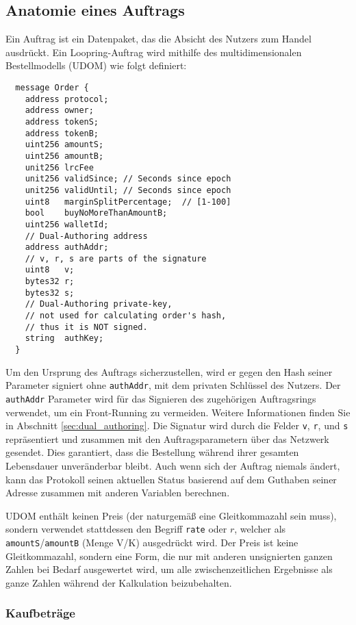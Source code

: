 \documentclass[UTF8,nofonts]{article}
\begin{document}
\begin{multicols}{2}
\subsection{Anatomie eines Auftrags\label{anatomy}}
Ein Auftrag ist ein Datenpaket, das die Absicht des Nutzers zum Handel ausdrückt. Ein Loopring-Auftrag wird mithilfe des multidimensionalen Bestellmodells (UDOM) wie folgt definiert:

\begin{verbatim}
  message Order {
    address protocol;
    address owner;
    address tokenS;
    address tokenB;
    uint256 amountS;
    uint256 amountB;
    unit256 lrcFee
    unit256 validSince; // Seconds since epoch
    unit256 validUntil; // Seconds since epoch
    uint8   marginSplitPercentage;  // [1-100]
    bool    buyNoMoreThanAmountB;
    uint256 walletId;
    // Dual-Authoring address
    address authAddr;
   	// v, r, s are parts of the signature
    uint8   v;       
    bytes32 r;
    bytes32 s;
    // Dual-Authoring private-key,
    // not used for calculating order's hash,
    // thus it is NOT signed.
    string  authKey;          
  }
\end{verbatim}

Um den Ursprung des Auftrags sicherzustellen, wird er gegen den Hash seiner Parameter signiert ohne \verb|authAddr|, mit dem privaten Schlüssel des Nutzers. Der \verb|authAddr| Parameter wird für das Signieren des zugehörigen Auftragsrings verwendet, um ein Front-Running zu vermeiden. Weitere Informationen finden Sie in Abschnitt \ref{sec:dual_authoring}. Die Signatur wird durch die Felder \verb|v|, \verb|r|, und \verb|s| repräsentiert und zusammen mit den Auftragsparametern über das Netzwerk gesendet. Dies garantiert, dass die Bestellung während ihrer gesamten Lebensdauer unveränderbar bleibt. Auch wenn sich der Auftrag niemals ändert, kann das Protokoll seinen aktuellen Status basierend auf dem Guthaben seiner Adresse zusammen mit anderen Variablen berechnen.

UDOM enthält keinen Preis (der naturgemäß eine Gleitkommazahl sein muss), sondern verwendet stattdessen den Begriff \verb|rate| oder $r$, welcher als \verb|amountS|/\verb|amountB| (Menge V/K) ausgedrückt wird. Der Preis ist keine Gleitkommazahl, sondern eine Form, die nur mit anderen unsignierten ganzen Zahlen bei Bedarf ausgewertet wird, um alle zwischenzeitlichen Ergebnisse als ganze Zahlen während der Kalkulation beizubehalten.

\subsubsection{Kaufbeträge}


\end{multicols}
\end{document}
